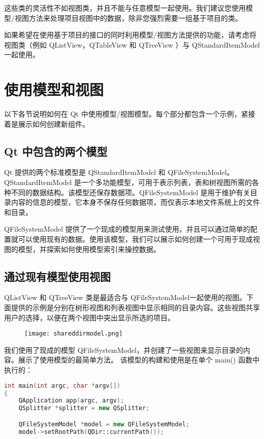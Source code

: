 这些类的灵活性不如视图类，并且不能与任意模型一起使用。我们建议您使用模型/视图方法来处理项目视图中的数据，除非您强烈需要一组基于项目的类。

如果希望在使用基于项目的接口的同时利用模型/视图方法提供的功能，请考虑将视图类（例如 QListView，QTableView 和 QTreeView ）与 QStandardItemModel 一起使用。

\section{使用模型和视图}

以下各节说明如何在 Qt 中使用模型/视图模型。每个部分都包含一个示例，紧接着是展示如何创建新组件。

\subsection{Qt 中包含的两个模型}

Qt 提供的两个标准模型是 QStandardItemModel 和 QFileSystemModel。QStandardItemModel 是一个多功能模型，可用于表示列表，表和树视图所需的各种不同的数据结构。该模型还保存数据项。QFileSystemModel 是用于维护有关目录内容的信息的模型，它本身不保存任何数据项，而仅表示本地文件系统上的文件和目录。

QFileSystemModel 提供了一个现成的模型用来测试使用，并且可以通过简单的配置就可以使用现有的数据。使用该模型，我们可以展示如何创建一个可用于现成视图的模型，并探索如何使用模型索引来操控数据。

\subsection{通过现有模型使用视图}

QListView 和 QTreeView 类是最适合与 QFileSystemModel一起使用的视图。下面提供的示例是分别在树形视图和列表视图中显示相同的目录内容。这些视图共享用户的选择，以便在两个视图中突出显示所选的项目。

\begin{figure}[hpt!]  
	\centering
    \texttt{[image: shareddirmodel.png]}
\end{figure}

我们使用了现成的模型 QFileSystemModel，并创建了一些视图来显示目录的内容。展示了使用模型的最简单方法。 该模型的构建和使用是在单个 main() 函数中执行的：

\begin{lstlisting}[language=C++]
int main(int argc, char *argv[])
{
    QApplication app(argc, argv);
    QSplitter *splitter = new QSplitter;

    QFileSystemModel *model = new QFileSystemModel;
    model->setRootPath(QDir::currentPath());
\end{lstlisting}

